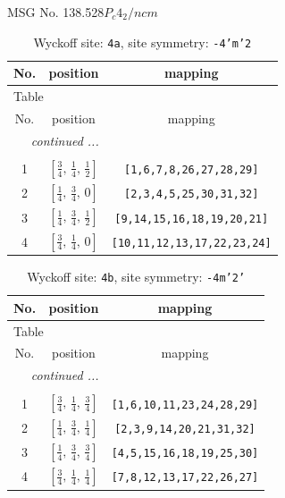 \documentclass[fleqn,8pt]{jsarticle}
\begin{document}
\setcounter{MaxMatrixCols}{32}

\renewcommand{\tablename}{Table~}
\renewcommand{\figurename}{Figure~}
\begin{center}
\LARGE
MSG No. 138.528\quad$P_{c}4_{2}/ncm$
\end{center}
\renewcommand{\arraystretch}{1.2}
\begin{longtable}{ccc}
\caption{Wyckoff site: {\tt 4a}, site symmetry: {\tt -4'm'2}}
 \\
 \hline \hline
No. & position & mapping \\ \hline \endfirsthead

\multicolumn{2}{l}{\tablename\ \thetable{}} \\
 \hline \hline
No. & position & mapping \\ \hline \endhead

 \hline \hline
\multicolumn{2}{r}{\footnotesize\it continued ...} \\ \endfoot

 \hline \hline
\multicolumn{2}{r}{} \\ \endlastfoot

1 & $\left[ \frac{3}{4},\, \frac{1}{4},\, \frac{1}{2} \right]$ & {\tt [1,6,7,8,26,27,28,29]} \\ \hline
2 & $\left[ \frac{1}{4},\, \frac{3}{4},\, 0 \right]$ & {\tt [2,3,4,5,25,30,31,32]} \\ \hline
3 & $\left[ \frac{1}{4},\, \frac{3}{4},\, \frac{1}{2} \right]$ & {\tt [9,14,15,16,18,19,20,21]} \\ \hline
4 & $\left[ \frac{3}{4},\, \frac{1}{4},\, 0 \right]$ & {\tt [10,11,12,13,17,22,23,24]} \\
\end{longtable}
\renewcommand{\arraystretch}{1.2}
\begin{longtable}{ccc}
\caption{Wyckoff site: {\tt 4b}, site symmetry: {\tt -4m'2'}}
 \\
 \hline \hline
No. & position & mapping \\ \hline \endfirsthead

\multicolumn{2}{l}{\tablename\ \thetable{}} \\
 \hline \hline
No. & position & mapping \\ \hline \endhead

 \hline \hline
\multicolumn{2}{r}{\footnotesize\it continued ...} \\ \endfoot

 \hline \hline
\multicolumn{2}{r}{} \\ \endlastfoot

1 & $\left[ \frac{3}{4},\, \frac{1}{4},\, \frac{3}{4} \right]$ & {\tt [1,6,10,11,23,24,28,29]} \\ \hline
2 & $\left[ \frac{1}{4},\, \frac{3}{4},\, \frac{1}{4} \right]$ & {\tt [2,3,9,14,20,21,31,32]} \\ \hline
3 & $\left[ \frac{1}{4},\, \frac{3}{4},\, \frac{3}{4} \right]$ & {\tt [4,5,15,16,18,19,25,30]} \\ \hline
4 & $\left[ \frac{3}{4},\, \frac{1}{4},\, \frac{1}{4} \right]$ & {\tt [7,8,12,13,17,22,26,27]} \\
\end{longtable}
\end{document}
